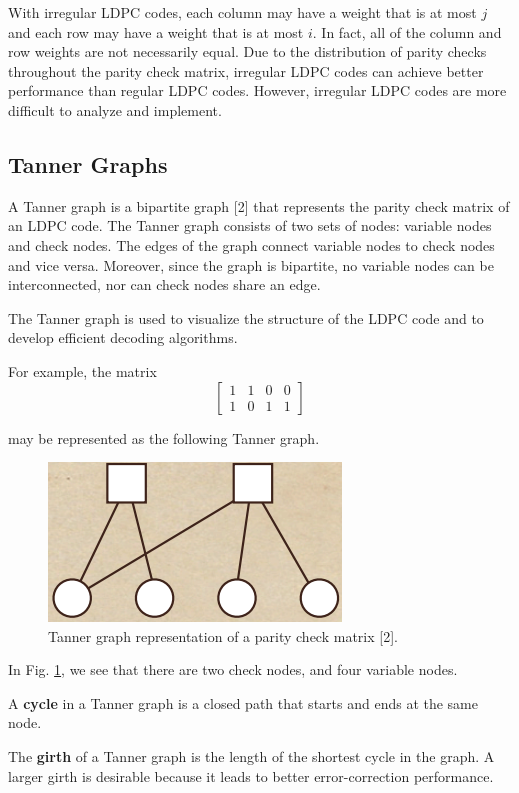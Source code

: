 \documentclass[conference]{IEEEtran}
\begin{document}
With irregular LDPC codes, each column may have a weight that is at most $j$ and each row may have a weight that is at most $i$.
In fact, all of the column and row weights are not necessarily equal.
Due to the distribution of parity checks throughout the parity check matrix, irregular LDPC codes can achieve better performance than regular LDPC codes.
However, irregular LDPC codes are more difficult to analyze and implement.

\subsection{Tanner Graphs}
A Tanner graph is a bipartite graph [2] that represents the parity check matrix of
an LDPC code. The Tanner graph consists of two sets of nodes: variable nodes
and check nodes. The edges of the graph connect variable nodes to check nodes
and vice versa.
Moreover, since the graph is bipartite, no variable nodes can be interconnected, nor can check nodes share an edge.

The Tanner graph is used to visualize the structure of the LDPC code and to
develop efficient decoding algorithms.

For example, the matrix
\[
  \begin{bmatrix}
    1 & 1 & 0 & 0 \\
    1 & 0 & 1 & 1
  \end{bmatrix}
\]

may be represented as the following Tanner graph.

\begin{figure}[htbp]
  \centerline{\includegraphics{Images/tanner_graph.png}}
  \caption{Tanner graph representation of a parity check matrix [2].}
  \label{fig}
\end{figure}

In Fig. \ref{fig}, we see that there are two check nodes, and four variable nodes.

A \textbf{cycle} in a Tanner graph is a closed path that starts and ends at the same node.

The \textbf{girth} of a Tanner graph is the length of the shortest cycle in the graph.
A larger girth is desirable because it leads to better error-correction performance.
\end{document}
